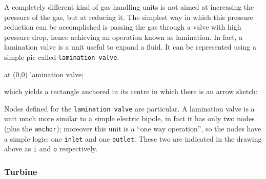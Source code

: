 \documentclass[12pt]{article}						%
\newcommand*{\chpn}[1]{\texttt{#1}}				%
\newcommand*{\chpp}[1]{\texttt{#1}}				%
\begin{document}
A completely different kind of gas handling units is not aimed at increasing
the pressure of the gas, but at reducing it. The simplest way in which this
pressure reduction can be accomplished is passing the gas through a valve with
high pressure drop, hence achieving an operation known as lamination. In fact, a
lamination valve is a unit useful to expand a fluid. It can be represented using
a simple pic called \chpp{lamination valve}:
\begin{chpcode}
	\pic at (0,0) {lamination valve};
\end{chpcode}
which yields a rectangle anchored in its centre in which there is an arrow
sketch:
\begin{center}
\end{center}

Nodes defined for the \chpp{lamination valve} are particular. A lamination
valve is a unit much more similar to a simple electric bipole, in fact it has
only two nodes (plus the \chpn{anchor}); moreover this unit is a ``one way
operation'', so the nodes have a simple logic: one \chpn{inlet} and one
\chpn{outlet}. These two are indicated in the drawing above as \chpn{i} and
\chpn{o} respectively.

\subsubsection{Turbine}
\end{document}
